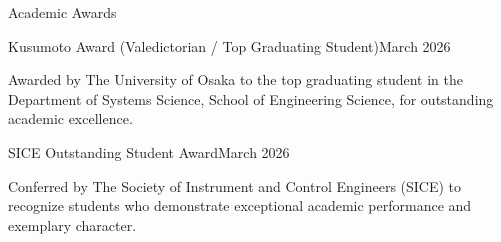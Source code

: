 \documentclass{resume} %
\begin{document}
\newpage
\begin{rSection}{Academic Awards}

  \begin{rSubsection}{Kusumoto Award (Valedictorian / Top Graduating Student)}{March 2026}{}{}
    \item Awarded by The University of Osaka to the top graduating student in the Department of Systems Science, School of Engineering Science, for outstanding academic excellence.
  \end{rSubsection}

  \begin{rSubsection}{SICE Outstanding Student Award}{March 2026}{}{}
    \item Conferred by The Society of Instrument and Control Engineers (SICE) to recognize students who demonstrate exceptional academic performance and exemplary character.
  \end{rSubsection}

\end{rSection}



\end{document}
